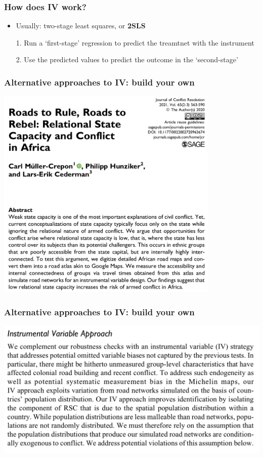 \documentclass[aspectratio=43]{beamer}
\begin{document}
\begin{frame}
\frametitle{How does IV work?}
\centering

\begin{itemize}
  \item Usually: two-stage least squares, or \textbf{2SLS}
  \item[1.] Run a `first-stage' regression to predict the treamtnet with the instrument
  \item[2.] Use the predicted values to predict the outcome in the `second-stage'
\end{itemize}

\end{frame}

\begin{frame}
\frametitle{Alternative approaches to IV: build your own}
\centering

\includegraphics[width = 0.8\textwidth]{../img/carl1}

\end{frame}

\begin{frame}
\frametitle{Alternative approaches to IV: build your own}
\centering

\includegraphics[width = \textwidth]{../img/carl9}

\end{frame}
\end{document}
